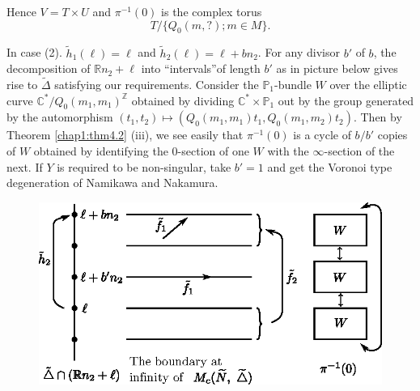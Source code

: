  Hence $V=T \times U$ and $\pi^{-1}(0)$ is the complex torus 
 $$
 T/\{Q_0(m,?); m \in M\}.
 $$
 
 In case (2). $\tilde{h}_1(\ell)= \ell$ and $\tilde{h}_2(\ell)= \ell
 +bn_2$. For any divisor $b'$ of $b$, the decomposition of
 $\mathbb{R}n_2 + \ell$ into ``intervals''\pageoriginale of length
 $b'$ as in 
 picture below gives rise to $\tilde{\Delta}$ satisfying our
 requirements. Consider the $\mathbb{P}_1$-bundle $W$ over the
 elliptic curve $\mathbb{C}^*/ Q_0(m_1, m_1)^{\mathbb{Z}}$ obtained by
 dividing $\mathbb{C}^* \times \mathbb{P}_1$ out by the group generated by
 the automorphism $(t_1, t_2) \mapsto (Q_0(m_1,m_1)t_1, Q_0(m_1,
 m_2)t_2)$. Then by  Theorem \ref{chap1:thm4.2} (iii), we see easily that
 $\pi^{-1}(0)$ is a cycle of $b/b'$ copies of $W$ obtained by
 identifying the 0-section of one $W$ with the $\infty$-section of
 the next. If $Y$ is required to be non-singular, take $b'=1$ and get
 the Voronoi type degeneration of Namikawa and Nakamura. 
\begin{figure}[H]
\centering 
\includegraphics{vol58-fig/fig58-62.eps} 
\end{figure}
 
